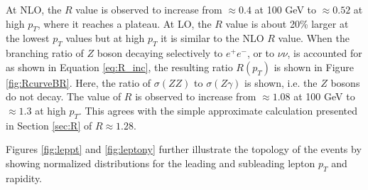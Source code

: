 \documentclass[12pt,a4paper,openright,twoside]{report}
\newcommand{\ZZ}{$ZZ\to \ell\ell\nu\nu$ }
\newcommand{\Zg}{$Z\gamma\to \ell\ell\gamma$ }
\begin{document}
At NLO, the $R$ value is observed to increase from $\approx 0.4$ at 100 GeV to $\approx 0.52$ at high $p_T$, where it reaches a plateau. At LO, the $R$ value is about 20\% larger at the lowest $p_T$ values but at high $p_T$ it is similar to the NLO $R$ value. When the branching ratio of $Z$ boson decaying selectively to $e^+e^-$, or to $\nu\nu$, is accounted for as shown in Equation \ref{eq:R_inc}, the resulting ratio $R(p_T)$ is shown in Figure \ref{fig:RcurveBR}. Here, the ratio of $\sigma(ZZ)$ to $\sigma(Z\gamma)$ is shown, i.e. the $Z$ bosons do not decay. The value of $R$ is observed to increase from $\approx 1.08$ at 100 GeV to $\approx 1.3$ at high $p_T$. This agrees with the simple approximate calculation presented in Section \ref{sec:R} of $R \approx 1.28$.

Figures \ref{fig:leppt} and \ref{fig:leptony} further illustrate the topology of the events by showing normalized distributions for the leading and subleading lepton $p_T$ and rapidity.
\end{document}

